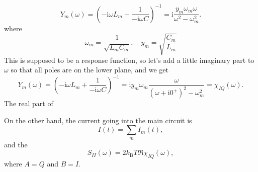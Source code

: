 \documentclass[hyperref, a4paper]{article}
\newcommand*{\ii}{\mathrm{i}}
\newcommand*{\kB}{k_{\text{B}}}
\begin{document}
\begin{equation}
    Y_m(\omega) = \left(
        - \ii \omega L_m + \frac{1}{- \ii \omega C}
    \right)^{-1} 
    = \ii \frac{y_m \omega_m \omega}{
        \omega^2 - \omega_m^2
    }. 
\end{equation}
where 
\begin{equation}
    \omega_m = \frac{1}{\sqrt{L_m C_m}}, \quad 
    y_m = \sqrt{\frac{C_m}{L_m}}
\end{equation}
This is supposed to be a response function,
so let's add a little imaginary part to $\omega$ 
so that all poles are on the lower plane,
and we get 
\begin{equation}
    Y_m(\omega) = \left(
        - \ii \omega L_m + \frac{1}{- \ii \omega C}
    \right)^{-1} 
    = \ii y_m \omega_m \frac{ \omega}{
        (\omega + \ii 0^+)^2 - \omega_m^2
    } = \chi_{I Q}(\omega). 
\end{equation}
The real part of 

On the other hand, the current going into the main circuit is 
\begin{equation}
    I(t) = \sum_m I_m(t),
\end{equation}
and the 
\begin{equation}
    S_{II}(\omega) = 2 \kB T \Re \chi_{I Q} (\omega),
\end{equation}
where $A = Q$ and $B = I$.

\printbibliography
\end{document}
